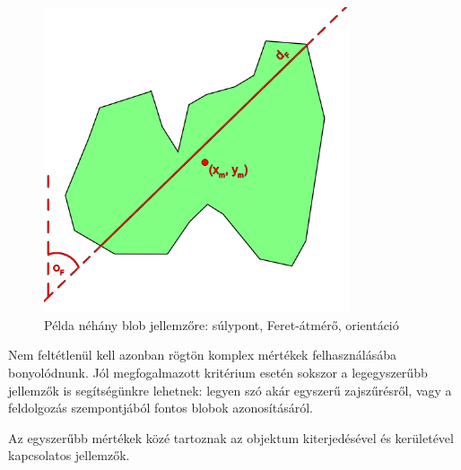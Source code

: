 \begin{figure}[!ht]
\centering
\includegraphics[width=90mm, keepaspectratio]{figures/blob_jellemzok.png}
\caption{Példa néhány blob jellemzőre: súlypont, Feret-átmérő, orientáció}
\label{fig:blob_jellemzok}
\end{figure}

Nem feltétlenül kell azonban rögtön komplex mértékek felhasználásába bonyolódnunk. Jól megfogalmazott kritérium esetén sokszor a legegyszerűbb jellemzők is segítségünkre lehetnek: legyen szó akár egyszerű zajszűrésről, vagy a feldolgozás szempontjából fontos blobok azonosításáról.

\bigskip

Az egyszerűbb mértékek közé tartoznak az objektum kiterjedésével és kerületével kapcsolatos jellemzők.

